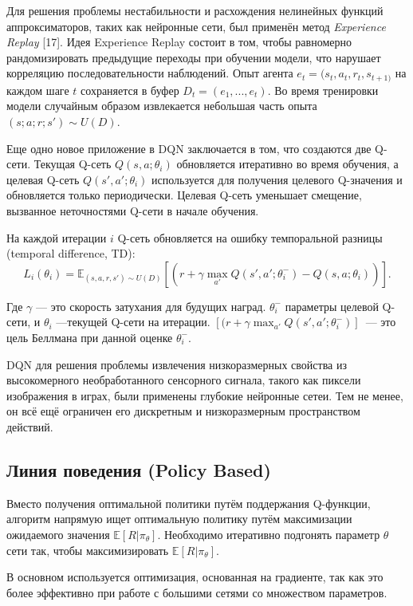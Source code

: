 Для решения проблемы нестабильности и расхождения нелинейных функций аппроксиматоров, таких как нейронные сети, был применён метод {\itshape Experience Replay} [17]. Идея Experience Replay состоит в том, чтобы равномерно рандомизировать предыдущие переходы при обучении модели, что нарушает корреляцию последовательности наблюдений. Опыт агента ${e_t = (s_t, a_t, r_t, s_{t+1)}}$ на каждом шаге $t$ сохраняется в буфер ${D_t = ({e_1, ..., e_t})}$. Во время тренировки модели случайным образом извлекается небольшая часть опыта ${(s; a; r; s') \sim U(D)}$.

Еще одно новое приложение в DQN заключается в том, что создаются две Q-сети.
Текущая Q-сеть $Q(s, a; \theta_i)$ обновляется итеративно во время обучения, а целевая Q-сеть $Q(s', a'; \theta_i)$ используется для получения целевого Q-значения и обновляется только периодически. Целевая Q-сеть уменьшает смещение, вызванное неточностями Q-сети в начале обучения.

На каждой итерации $i$ Q-сеть обновляется на ошибку темпоральной разницы (temporal difference, TD):
\begin{equation}
    \label{eq:someEq}
    L_i(\theta_i) = \mathbb{E}_{(s, a, r, s') \sim U(D)} [(r + \gamma \max_{a'} Q(s', a'; \theta_i^-) - Q(s, a; \theta _i))].
\end{equation}

Где $\gamma$ — это скорость затухания для будущих наград. $\theta _i^-$ параметры целевой Q-сети, и $\theta_i$ ---текущей Q-сети на итерации. $[(r + \gamma \max_{a'} Q(s', a'; \theta_i^-)]$~--- это цель Беллмана при данной оценке $\theta_i^-$.

DQN для решения проблемы извлечения низкоразмерных свойства из высокомерного необработанного сенсорного сигнала, такого как пиксели изображения в играх, были применены глубокие нейронные сетеи. Тем не менее, он всё ещё ограничен его дискретным и низкоразмерным пространством действий.

\subsection{Линия поведения (Policy Based)}

Вместо получения оптимальной политики путём поддержания Q-функции, алгоритм напрямую ищет оптимальную политику путём максимизации ожидаемого значения $\mathbb{E}[R|\pi_\theta]$. Необходимо итеративно подгонять параметр $\theta$ сети так, чтобы максимизировать $\mathbb{E}[R|\pi_\theta]$.

В основном используется оптимизация, основанная на градиенте, так как это более эффективно при работе с большими сетями со множеством параметров. \cite{Arulkumaran_2017}

